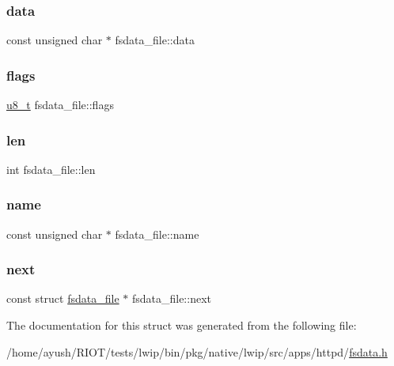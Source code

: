 \subsubsection{\texorpdfstring{data}{data}}
{\footnotesize\ttfamily const unsigned char $\ast$ fsdata\+\_\+file\+::data}

\mbox{\label{structfsdata__file_a8e3c2a4d5d7a06ec4295560b31785851}} 
\subsubsection{\texorpdfstring{flags}{flags}}
{\footnotesize\ttfamily \hyperlink{group__compiler__abstraction_ga4caecabca98b43919dd11be1c0d4cd8e}{u8\+\_\+t} fsdata\+\_\+file\+::flags}

\mbox{\label{structfsdata__file_a88cb83eb2c7095fde099fe0d5dc8e7f6}} 
\subsubsection{\texorpdfstring{len}{len}}
{\footnotesize\ttfamily int fsdata\+\_\+file\+::len}

\mbox{\label{structfsdata__file_ae085a826b4ea40cac79269ee139918e8}} 
\subsubsection{\texorpdfstring{name}{name}}
{\footnotesize\ttfamily const unsigned char $\ast$ fsdata\+\_\+file\+::name}

\mbox{\label{structfsdata__file_a0fc472e6f90ff7abb10941fee5aadde6}} 
\subsubsection{\texorpdfstring{next}{next}}
{\footnotesize\ttfamily const struct \hyperlink{structfsdata__file}{fsdata\+\_\+file} $\ast$ fsdata\+\_\+file\+::next}



The documentation for this struct was generated from the following file\+:\begin{DoxyCompactItemize}
\item 
/home/ayush/\+R\+I\+O\+T/tests/lwip/bin/pkg/native/lwip/src/apps/httpd/\hyperlink{native_2lwip_2src_2apps_2httpd_2fsdata_8h}{fsdata.\+h}\end{DoxyCompactItemize}

